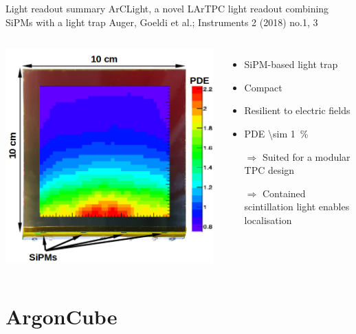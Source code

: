 \documentclass[]{beamer}
\newcommand*{\emphcol}{red}
\newcommand*{\emphcoltitle}{blue}
\newcommand*{\AC}{{ArgonCube}}
\newcommand*{\AL}{{ArCLight}}
\newcommand*{\lartpc}{{LArTPC}}
\begin{document}
\begin{frame}{Light readout summary}{\color{\emphcoltitle} \AL{}, a novel \lartpc{} light readout combining SiPMs with a light trap}
	{\tiny Auger, Goeldi et al.; Instruments 2 (2018) no.1, 3~\cite{arclight}}
	\begin{columns}[c]
		\centering
		\includegraphics[width=\textwidth]{arclight/PDE}\\
		\begin{itemize}
			\item SiPM-based light trap
			\item Compact
			\item Resilient to electric fields
			\item PDE \SI{\sim 1}{\percent}
			\item[$\Rightarrow$] Suited for a modular TPC design
			\item[$\Rightarrow$] {\color{\emphcol} Contained scintillation light enables localisation}
		\end{itemize}
	\end{columns}
\end{frame}

\section{\AC{}}
\end{document}
